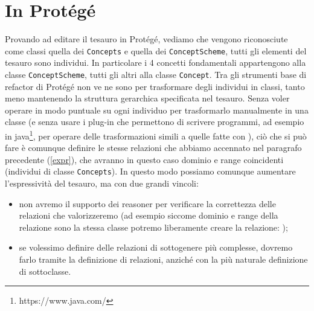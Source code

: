 \section{In Protégé}
Provando ad editare il tesauro in Protégé, vediamo che vengono riconosciute come classi quella dei \verb|Concepts| e quella dei \verb|ConceptScheme|, tutti gli elementi del tesauro sono individui. In particolare i 4 concetti fondamentali appartengono alla classe \verb|ConceptScheme|, tutti gli altri alla classe \verb|Concept|. Tra gli strumenti base di refactor di Protégé non ve ne sono per trasformare degli individui in classi, tanto meno mantenendo la struttura gerarchica specificata nel tesauro. Senza voler operare in modo puntuale su ogni individuo per trasformarlo manualmente in una classe (e senza usare i plug-in che permettono di scrivere programmi, ad esempio in java\footnote{https://www.java.com/}, per operare delle trasformazioni simili a quelle fatte con \cduce), ciò che si può fare è comunque definire le stesse relazioni che abbiamo accennato nel paragrafo precedente (\ref{expr}), che avranno in questo caso dominio e range coincidenti (individui di classe \verb|Concepts|). In questo modo possiamo comunque aumentare l'espressività del tesauro, ma con due grandi vincoli:
\begin{itemize}
	\item non avremo il supporto dei reasoner per verificare la correttezza delle relazioni che valorizzeremo (ad esempio siccome dominio e range della relazione  sono la stessa classe potremo liberamente creare la relazione: );
	\item se volessimo definire delle relazioni di sottogenere più complesse, dovremo farlo tramite la definizione di relazioni, anziché con la più naturale definizione di sottoclasse.
\end{itemize}
